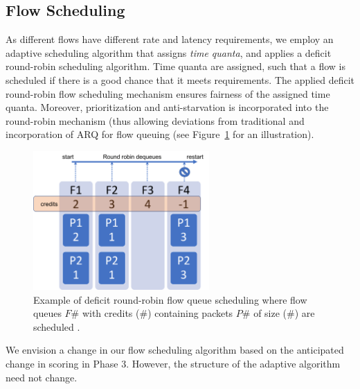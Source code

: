 \documentclass[11pt]{article}
\begin{document}
\subsection{Flow Scheduling}
As different flows have different rate and latency requirements, we employ an adaptive scheduling algorithm that assigns \emph{time quanta}, and applies a deficit round-robin scheduling algorithm. Time quanta are assigned, such that a flow is scheduled if there is a good chance that it meets requirements. The applied deficit round-robin flow scheduling mechanism ensures fairness of the assigned time quanta.  Moreover, prioritization and anti-starvation is incorporated into the round-robin mechanism (thus allowing deviations from traditional and incorporation of ARQ for flow queuing (see Figure~\ref{fig:schedule} for an illustration).
\begin{figure} [htb]
     \centerline{
     \includegraphics[width = 0.6\textwidth]{Figures/DeficitRR.png}}
     \caption{Example of deficit round-robin flow queue scheduling where flow queues $F\#$ with credits ($\#$) containing packets $P\#$ of size ($\#$) are scheduled \cite[Figure $3$]{func-report}.}
     \label{fig:schedule}
     \end{figure}
We envision a change in our flow scheduling algorithm based on the anticipated change in scoring in Phase 3. However, the structure of the adaptive algorithm need not change.     
\end{document}
